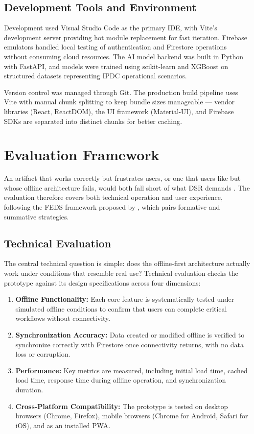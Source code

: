 \subsection{Development Tools and Environment}

Development used Visual Studio Code as the primary IDE, with Vite's development server providing hot module replacement for fast iteration. Firebase emulators handled local testing of authentication and Firestore operations without consuming cloud resources. The AI model backend was built in Python with FastAPI, and models were trained using scikit-learn and XGBoost on structured datasets representing IPDC operational scenarios.

Version control was managed through Git. The production build pipeline uses Vite with manual chunk splitting to keep bundle sizes manageable --- vendor libraries (React, ReactDOM), the UI framework (Material-UI), and Firebase SDKs are separated into distinct chunks for better caching.

\section{Evaluation Framework}

An artifact that works correctly but frustrates users, or one that users like but whose offline architecture fails, would both fall short of what DSR demands \citep{Hevner2004}. The evaluation therefore covers both technical operation and user experience, following the FEDS framework proposed by \citet{Venable2016}, which pairs formative and summative strategies.

\subsection{Technical Evaluation}

The central technical question is simple: does the offline-first architecture actually work under conditions that resemble real use? Technical evaluation checks the prototype against its design specifications across four dimensions:

\begin{enumerate}
\item \textbf{Offline Functionality:} Each core feature is systematically tested under simulated offline conditions to confirm that users can complete critical workflows without connectivity.
\item \textbf{Synchronization Accuracy:} Data created or modified offline is verified to synchronize correctly with Firestore once connectivity returns, with no data loss or corruption.
\item \textbf{Performance:} Key metrics are measured, including initial load time, cached load time, response time during offline operation, and synchronization duration.
\item \textbf{Cross-Platform Compatibility:} The prototype is tested on desktop browsers (Chrome, Firefox), mobile browsers (Chrome for Android, Safari for iOS), and as an installed PWA.
\end{enumerate}

